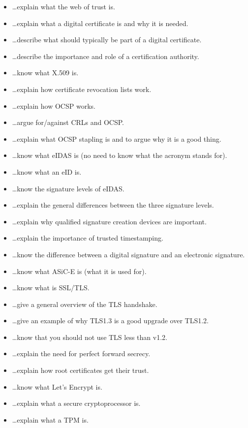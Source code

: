 \documentclass[usegeometry,parskip=half]{scrartcl}
\begin{document}
\begin{itemize}
  \item \dots{}explain what the web of trust is.
  \item \dots{}explain what a digital certificate is and why it is needed.
  \item \dots{}describe what should typically be part of a digital certificate.
  \item \dots{}describe the importance and role of a certification authority.
  \item \dots{}know what X.509 is.
  \item \dots{}explain how certificate revocation lists work.
  \item \dots{}explain how OCSP works.
  \item \dots{}argue for/against CRLs and OCSP.
  \item \dots{}explain what OCSP stapling is and to argue why it is a good thing.
  \item \dots{}know what eIDAS is (no need to know what the acronym stands for).
  \item \dots{}know what an eID is.
  \item \dots{}know the signature levels of eIDAS.
  \item \dots{}explain the general differences between the three signature levels.
  \item \dots{}explain why qualified signature creation devices are important.
  \item \dots{}explain the importance of trusted timestamping.
  \item \dots{}know the difference between a digital signature and an electronic signature.
  \item \dots{}know what ASiC-E is (what it is used for).
  \item \dots{}know what is SSL/TLS.
  \item \dots{}give a general overview of the TLS handshake.
  \item \dots{}give an example of why TLS1.3 is a good upgrade over TLS1.2.
  \item \dots{}know that you should not use TLS less than v1.2.
  \item \dots{}explain the need for perfect forward secrecy.
  \item \dots{}explain how root certificates get their trust.
  \item \dots{}know what Let's Encrypt is.
  \item \dots{}explain what a secure cryptoprocessor is.
  \item \dots{}explain what a TPM is.

\end{itemize}
\end{document}
